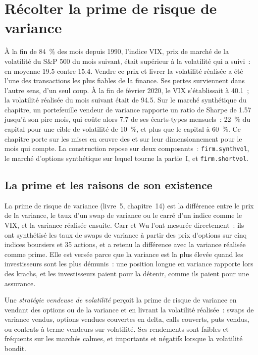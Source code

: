 \chapter{Récolter la prime de risque de variance}\label{ch:s2:harvesting-the-variance-risk-premium}

À la fin de 84~\% des mois depuis 1990, l'indice VIX, prix de marché de la volatilité du S\&P 500 du mois suivant, était supérieur à la volatilité qui
a suivi~: en moyenne 19.5 contre 15.4. Vendre ce prix et livrer la volatilité réalisée a été l'une des transactions les plus fiables de la finance.
Ses pertes surviennent dans l'autre sens, d'un seul coup. À la fin de février 2020, le VIX s'établissait à 40.1~; la volatilité réalisée du mois suivant était de 94.5. Sur le
marché synthétique du chapitre, un portefeuille vendeur de variance rapporte un ratio de Sharpe de 1.57 jusqu'à son pire mois, qui coûte alors 7.7 de ses écarts-types
mensuels~: 22~\% du capital pour une cible de volatilité de 10~\%, et plus que le capital à 60~\%. Ce chapitre porte sur les mises en œuvre des  et sur leur dimensionnement pour le mois qui compte. La construction repose sur deux composants~: \texttt{firm.synthvol}, le marché d'options synthétique sur lequel
tourne la partie~I, et \texttt{firm.shortvol}.

\section{La prime et les raisons de son existence}

La prime de risque de variance (livre~5, chapitre~14) est la différence entre le prix de la variance, le taux d'un swap de variance ou le carré d'un indice
comme le VIX, et la variance réalisée ensuite. Carr et Wu l'ont mesurée directement~: ils ont synthétisé les taux de swaps de variance à partir des prix d'options sur
cinq indices boursiers et 35 actions, et a retenu la différence avec la variance réalisée comme prime. Elle est versée parce que la variance est la plus élevée quand
les investisseurs sont les plus démunis~: une position longue en variance rapporte lors des krachs, et les investisseurs paient pour la détenir, comme ils paient pour une assurance.

\begin{definition}\label{def:s2:harvesting-the-variance-risk-premium:short}
Une \emph{stratégie vendeuse de volatilité} perçoit la prime de risque de variance en vendant des options ou de la variance et en livrant
la volatilité réalisée~: swaps de variance vendus, options vendues couvertes en delta, calls couverts, puts vendus, ou contrats à terme vendeurs sur volatilité. Ses rendements sont faibles et
fréquents sur les marchés calmes, et importants et négatifs lorsque la volatilité bondit.
\end{definition}

